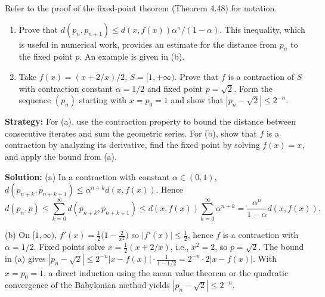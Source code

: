 \begin{problembox}
\begin{problemstatement}
Refer to the proof of the fixed-point theorem (Theorem 4.48) for notation.
\begin{enumerate}[label=(\alph*)]
\item Prove that $d(p_n, p_{n+1}) \leq d(x, f(x)) \alpha^n / (1 - \alpha)$. This inequality, which is useful in numerical work, provides an estimate for the distance from $p_n$ to the fixed point $p$. An example is given in (b).
\item Take $f(x) = (x + 2/x)/2$, $S = [1, +\infty)$. Prove that $f$ is a contraction of $S$ with contraction constant $\alpha = 1/2$ and fixed point $p = \sqrt{2}$. Form the sequence $(p_n)$ starting with $x=p_0=1$ and show that $|p_n - \sqrt{2}| \le 2^{-n}$.
\end{enumerate}
\end{problemstatement}
\end{problembox}

\noindent\textbf{Strategy:} For (a), use the contraction property to bound the distance between consecutive iterates and sum the geometric series. For (b), show that $f$ is a contraction by analyzing its derivative, find the fixed point by solving $f(x) = x$, and apply the bound from (a).

\bigskip\noindent\textbf{Solution:}
(a) In a contraction with constant $\alpha\in(0,1)$, $d(p_{n+k},p_{n+k+1})\le \alpha^{n+k}d(x,f(x))$. Hence
\[
d(p_n,p)\le \sum_{k=0}^{\infty} d(p_{n+k},p_{n+k+1})\le d(x,f(x))\sum_{k=0}^{\infty}\alpha^{n+k}=\frac{\alpha^n}{1-\alpha}d(x,f(x)).
\]

(b) On $[1,\infty)$, $f'(x)=\tfrac12\big(1-\tfrac{2}{x^2}\big)$ so $|f'(x)|\le \tfrac12$, hence $f$ is a contraction with $\alpha=1/2$. Fixed points solve $x=\tfrac12(x+2/x)$, i.e., $x^2=2$, so $p=\sqrt2$. The bound in (a) gives $|p_n-\sqrt2|\le 2^{-n}|x-f(x)|\cdot\tfrac{1}{1-1/2}=2^{-n}\cdot 2|x-f(x)|$. With $x=p_0=1$, a direct induction using the mean value theorem or the quadratic convergence of the Babylonian method yields $|p_n-\sqrt2|\le 2^{-n}$.

